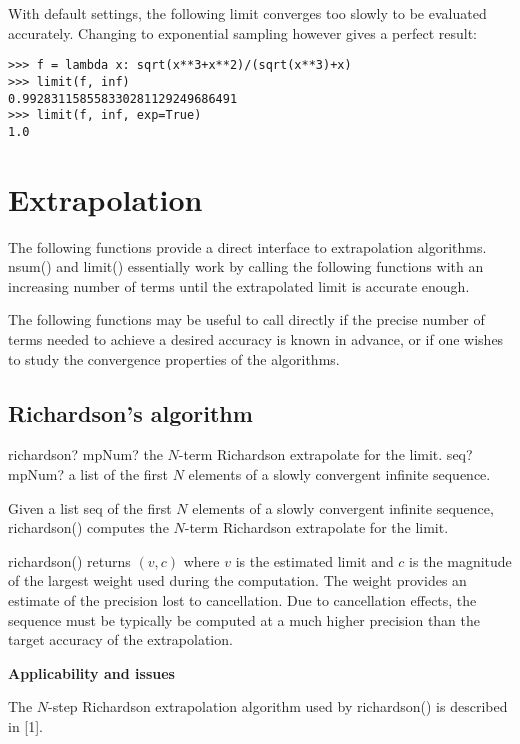 With default settings, the following limit converges too slowly to be evaluated accurately. Changing to exponential sampling however gives a perfect result:

\begin{lstlisting}
>>> f = lambda x: sqrt(x**3+x**2)/(sqrt(x**3)+x)
>>> limit(f, inf)
0.992831158558330281129249686491
>>> limit(f, inf, exp=True)
1.0
\end{lstlisting}



\newpage
\section{Extrapolation}
The following functions provide a direct interface to extrapolation algorithms. nsum() and limit() essentially work by calling the following functions with an increasing number of terms until the extrapolated limit is accurate enough.

The following functions may be useful to call directly if the precise number of terms needed to achieve a desired accuracy is known in advance, or if one wishes to study the convergence properties of the algorithms.



\subsection{Richardson's algorithm}

\begin{mpFunctionsExtract}
	\mpFunctionOne
	{richardson? mpNum? the $N$-term Richardson extrapolate for the limit.}
	{seq? mpNum? a list of the first $N$ elements of a slowly convergent infinite sequence.}	
\end{mpFunctionsExtract}


\vpara
Given a list seq of the first $N$ elements of a slowly convergent infinite sequence, richardson() computes the $N$-term Richardson extrapolate for the limit.

richardson() returns $(v,c)$ where $v$ is the estimated limit and $c$ is the magnitude of the largest weight used during the computation. The weight provides an estimate of the precision lost to cancellation. Due to cancellation effects, the sequence must be typically be computed at a much higher precision than the target accuracy of the extrapolation.

\vpara
\textbf{Applicability and issues}

The $N$-step Richardson extrapolation algorithm used by richardson() is described in [1].

